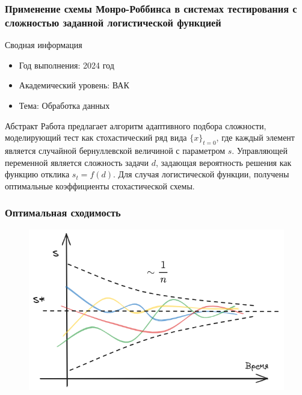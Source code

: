 

\begin{frame}
    \frametitle{Применение схемы Монро-Роббинса в системах тестирования с сложностью заданной логистической функцией}

    \begin{block}{Сводная информация}
        \begin{itemize}
            \item Год выполнения: 2024 год
            \item Академический уровень: ВАК
            \item Тема: Обработка данных
        \end{itemize}
    \end{block}  
    
    \begin{block}{Абстракт} 
        Работа предлагает алгоритм адаптивного подбора сложности, моделирующий тест как стохастический ряд вида $\{x\}_{t=0}$, где каждый элемент является случайной бернуллевской величиной с параметром $s$. 
        Управляющей переменной является сложность задачи $d$, задающая вероятность решения как функцию отклика $s_t = f(d)$. 
        Для случая логистической функции, получены оптимальные коэффициенты стохастической схемы.
    \end{block}
\end{frame}

\begin{frame}
    \frametitle{Оптимальная сходимость}
    \centering

    \begin{figure}
        \includegraphics[width=0.9\linewidth]{assets/r-b.excalidraw.png}
    \end{figure}
\end{frame}

